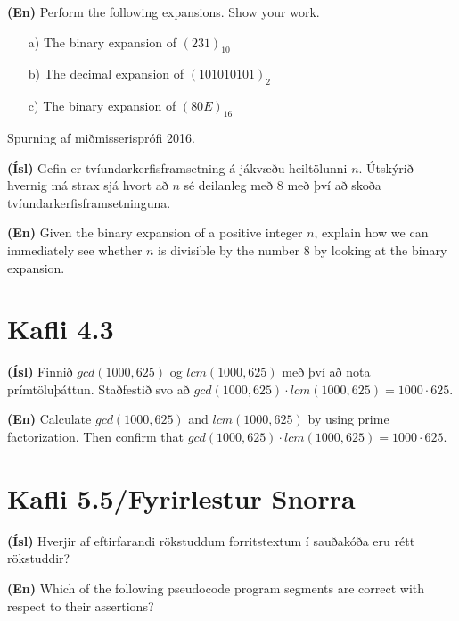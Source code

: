 \documentclass{article}
\begin{document}
\textbf{(En)} Perform the following expansions. Show your work.

\begin{itemize}
    \item[a)] The binary expansion of $(231)_{10}$
    \item[b)] The decimal expansion of $(101010101)_2$
    \item[c)] The binary expansion of $(80E)_{16}$
\end{itemize}

\question 

Spurning af miðmisserisprófi 2016.

\textbf{(Ísl)} Gefin er tvíundarkerfisframsetning á jákvæðu heiltölunni $n$. Útskýrið hvernig má strax sjá hvort að $n$ sé deilanleg með 8 með því að skoða tvíundarkerfisframsetninguna.

\textbf{(En)} Given the binary expansion of a positive integer $n$, explain how we can immediately see whether $n$ is divisible by the number 8 by looking at the binary expansion.

\section{Kafli 4.3}

\question 

\textbf{(Ísl)} Finnið $gcd(1000,625)$ og $lcm(1000,625)$ með því að nota prímtöluþáttun. Staðfestið svo að $gcd(1000,625) \cdot lcm(1000,625) = 1000 \cdot 625$.

\textbf{(En)} Calculate $gcd(1000,625)$ and $lcm(1000,625)$ by using prime factorization. Then confirm that $gcd(1000,625) \cdot lcm(1000,625) = 1000 \cdot 625$.

\newpage
\section{Kafli 5.5/Fyrirlestur Snorra}

\question

\textbf{(Ísl)} Hverjir af eftirfarandi rökstuddum forritstextum í sauðakóða eru rétt rökstuddir?

\textbf{(En)} Which of the following pseudocode program segments are correct with respect to their assertions?
\end{document}
